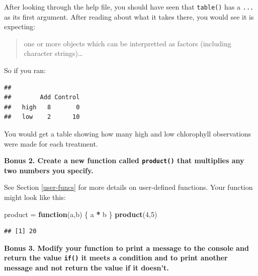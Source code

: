 \documentclass[]{book}
\newenvironment{Shaded}{\begin{snugshade}}{\end{snugshade}}
\newcommand{\ControlFlowTok}[1]{\textcolor[rgb]{0.13,0.29,0.53}{\textbf{#1}}}
\newcommand{\DecValTok}[1]{\textcolor[rgb]{0.00,0.00,0.81}{#1}}
\newcommand{\KeywordTok}[1]{\textcolor[rgb]{0.13,0.29,0.53}{\textbf{#1}}}
\newcommand{\NormalTok}[1]{#1}
\newcommand{\OperatorTok}[1]{\textcolor[rgb]{0.81,0.36,0.00}{\textbf{#1}}}
\newcommand{\StringTok}[1]{\textcolor[rgb]{0.31,0.60,0.02}{#1}}
\begin{document}
After looking through the help file, you should have seen that \texttt{table()} has a \texttt{...} as its first argument. After reading about what it takes there, you would see it is expecting:

\begin{quote}
one or more objects which can be interpretted as factors (including character strings)\ldots{}
\end{quote}

So if you ran:

\begin{Shaded}
\end{Shaded}

\begin{verbatim}
##       
##        Add Control
##   high   8       0
##   low    2      10
\end{verbatim}

You would get a table showing how many high and low chlorophyll observations were made for each treatment.

\textbf{Bonus 2. Create a new function called \texttt{product()} that multiplies any two numbers you specify.}

See Section \ref{user-funcs} for more details on user-defined functions. Your function might look like this:

\begin{Shaded}
\begin{Highlighting}[]
\NormalTok{product =}\StringTok{ }\ControlFlowTok{function}\NormalTok{(a,b) \{}
\NormalTok{  a }\OperatorTok{*}\StringTok{ }\NormalTok{b}
\NormalTok{\}}
\KeywordTok{product}\NormalTok{(}\DecValTok{4}\NormalTok{,}\DecValTok{5}\NormalTok{)}
\end{Highlighting}
\end{Shaded}

\begin{verbatim}
## [1] 20
\end{verbatim}

\textbf{Bonus 3. Modify your function to print a message to the console and return the value \texttt{if()} it meets a condition and to print another message and not return the value if it doesn't.}
\end{document}
